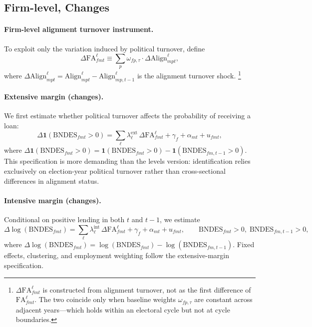 \documentclass{article}
\newcommand{\Align}{\mathrm{Align}}
\newcommand{\FA}{\mathrm{FA}}
\begin{document}
\subsection{Firm-level, Changes}

\paragraph{Firm-level alignment turnover instrument.}
To exploit only the variation induced by political turnover, define
\[
  \Delta\FA^{\ell}_{fmt} \equiv \sum_{p} \omega_{fp,\tau} \cdot \Delta\Align^{\ell}_{mpt},
\]
where $\Delta\Align^{\ell}_{mpt} = \Align^{\ell}_{mpt} - \Align^{\ell}_{mp,t-1}$
is the alignment turnover shock.%
\footnote{\label{fn:not-first-diff}$\Delta\FA^{\ell}_{fmt}$ is constructed from alignment turnover,
not as the first difference of $\FA^{\ell}_{fmt}$.
The two coincide only when baseline weights $\omega_{fp,\tau}$ are constant across
adjacent years---which holds within an electoral cycle but not at cycle boundaries.}

\paragraph{Extensive margin (changes).}
We first estimate whether political turnover affects the probability of receiving a loan:
\[
  \Delta\mathbf{1}(\text{BNDES}_{fmt} > 0) = \sum_{\ell} \lambda^{\text{ext}}_{\ell}\,\Delta\FA^{\ell}_{fmt}
  + \gamma_{f} + \alpha_{mt} + u_{fmt},
\]
where $\Delta\mathbf{1}(\text{BNDES}_{fmt} > 0)
= \mathbf{1}(\text{BNDES}_{fmt} > 0) - \mathbf{1}(\text{BNDES}_{fm,t-1} > 0)$.
This specification is more demanding than the levels version: identification relies exclusively on election-year political turnover rather than cross-sectional differences in alignment status.

\paragraph{Intensive margin (changes).}
Conditional on positive lending in both $t$ and $t-1$, we estimate
\[
  \Delta\log(\text{BNDES}_{fmt}) = \sum_{\ell} \lambda^{\text{int}}_{\ell}\,\Delta\FA^{\ell}_{fmt}
  + \gamma_{f} + \alpha_{mt} + u_{fmt},
  \qquad \text{BNDES}_{fmt} > 0,\; \text{BNDES}_{fm,t-1} > 0,
\]
where $\Delta\log(\text{BNDES}_{fmt}) = \log(\text{BNDES}_{fmt}) - \log(\text{BNDES}_{fm,t-1})$.
Fixed effects, clustering, and employment weighting follow the extensive-margin specification.
\end{document}
